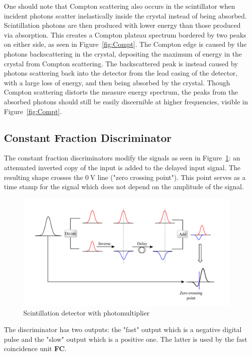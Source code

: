 \documentclass[twocolumn]{article}
\begin{document}
\par One should note that Compton scattering also occurs in the scintillator when incident photons scatter inelastically inside the crystal instead of being absorbed. Scintillation photons are then produced with lower energy than those produced via absorption. This creates a Compton plateau spectrum bordered by two peaks on either side, as seen in Figure~\ref{fig:Compt}. The Compton edge is caused by the photons backscattering in the crystal, depositing the maximum of energy in the crystal from Compton scattering. The backscattered peak is instead caused by photons scattering back into the detector from the lead casing of the detector, with a large loss of energy, and then being absorbed by the crystal.\cite{Compton} Though Compton scattering distorts the measure energy spectrum, the peaks from the absorbed photons should still be easily discernible at higher frequencies, visible in Figure~\ref{fig:Compt}.


\subsection{Constant Fraction Discriminator}
The constant fraction discriminators modify the signals as seen in Figure~\ref{fig:cfd}: an attenuated inverted copy of the input is added to the delayed input signal. The resulting shape crosses the $\SI{0}{\volt}$ line ("zero crossing point"). This point serves as a time stamp for the signal which does not depend on the amplitude of the signal.
\begin{figure}[!h]
	\centering
	\includegraphics[width=1.02\linewidth]{cfd.png}
	\caption{Scintillation detector with photomultiplier\cite{cfd}} 
	\label{fig:cfd}
\end{figure}
The discriminator has two outputs: the "fast" output which is a negative digital pulse and the "slow" output which is a positive one. The latter is used by the fast coincidence unit \textbf{FC}.
\end{document}
